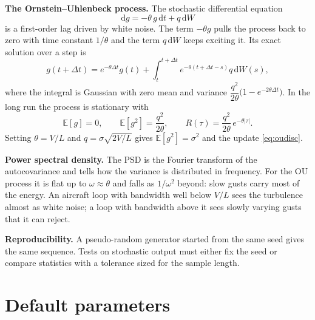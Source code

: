 \documentclass[11pt,a4paper]{article}
\newcommand{\dd}{\mathrm{d}}
\newcommand{\E}{\mathbb{E}}
\begin{document}
\textbf{The Ornstein--Uhlenbeck process.} The stochastic differential equation
\begin{equation}
\dd g = -\theta\,g\,\dd t + q\,\dd W
\end{equation}
is a first-order lag driven by white noise. The term $-\theta g$ pulls the
process back to zero with time constant $1/\theta$ and the term $q\,\dd W$
keeps exciting it. Its exact solution over a step is
\[
g(t+\Delta t)=e^{-\theta\Delta t}g(t)+\int_t^{t+\Delta t}\!e^{-\theta(t+\Delta t-s)}q\,\dd W(s),
\]
where the integral is Gaussian with zero mean and variance
$\dfrac{q^2}{2\theta}\bigl(1-e^{-2\theta\Delta t}\bigr)$. In the long run the
process is stationary with
\begin{equation}
\E[g]=0,\qquad \E[g^2]=\frac{q^2}{2\theta},\qquad
R(\tau)=\frac{q^2}{2\theta}\,e^{-\theta|\tau|}.
\end{equation}
Setting $\theta=V/L$ and $q=\sigma\sqrt{2V/L}$ gives $\E[g^2]=\sigma^2$ and
the update \eqref{eq:oudisc}.

\textbf{Power spectral density.} The PSD is the Fourier transform of the
autocovariance and tells how the variance is distributed in frequency. For
the OU process it is flat up to $\omega\approx\theta$ and falls as
$1/\omega^2$ beyond: slow gusts carry most of the energy. An aircraft loop
with bandwidth well below $V/L$ sees the turbulence almost as white noise; a
loop with bandwidth above it sees slowly varying gusts that it can reject.

\textbf{Reproducibility.} A pseudo-random generator started from the same seed
gives the same sequence. Tests on stochastic output must either fix the seed
or compare statistics with a tolerance sized for the sample length.

\section{Default parameters}\label{app:params}
\end{document}
